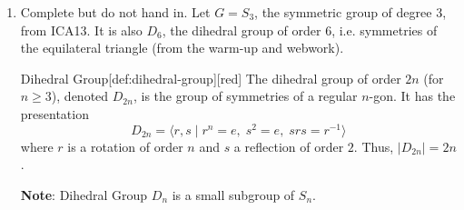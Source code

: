 \begin{enumerate}
  \newpage
  \item Complete but do not hand in.
  Let $G=S_3$, the symmetric group of degree 3, from ICA13. 
  It is also $D_6$, the dihedral group of order 6, i.e. 
  symmetries of the equilateral triangle (from the warm-up and webwork).
  \begin{define}{Dihedral Group}[def:dihedral-group][red]
    The dihedral group of order $2n$ (for $n \geq 3$), denoted $D_{2n}$, is the group of symmetries of a 
    regular $n$-gon. It has the presentation
    \[
    D_{2n}=\langle r,s \mid r^n=e,\; s^2=e,\; srs=r^{-1}\rangle
    \]
    where $r$ is a rotation of order $n$ and $s$ a reflection of order $2$. 
    Thus, $\lvert D_{2n}\rvert=2n$. 
    \begin{center}
    \end{center}
    \textbf{Note}: Dihedral Group $D_n$ is a small subgroup of $S_n$.
  \end{define}




\end{enumerate}
